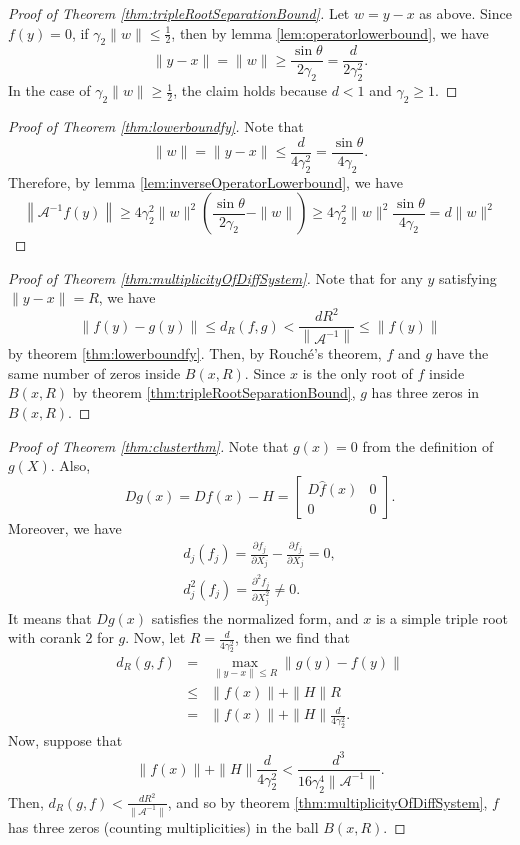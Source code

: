 \documentclass[12pt,oneside,reqno]{amsart}
\theoremstyle{definition}
\begin{document}
\begin{proof}[Proof of Theorem \ref{thm:tripleRootSeparationBound}]
	Let $w=y-x$ as above. Since $f(y)=0$, if $\gamma_2\|w\|\leq \frac{1}{2}$, then by lemma \ref{lem:operatorlowerbound}, we have
	\[\|y-x\|=\|w\|\geq\frac{\sin\theta}{2\gamma_2}=\frac{d}{2\gamma_2^2} .\]
	In the case of $\gamma_2\|w\|\geq \frac{1}{2}$, the claim holds because $d<1$ and $\gamma_2\geq 1$.
\end{proof}
\begin{proof}[Proof of Theorem \ref{thm:lowerboundfy}]
	Note that 
	\[\|w\|=\|y-x\|\leq \frac{d}{4\gamma_2^2}=\frac{\sin\theta}{4\gamma_2}.\]
	Therefore, by lemma \ref{lem:inverseOperatorLowerbound}, we have
	\[\left\|\mathcal{A}^{-1}f(y)\right\|\geq 4\gamma_2^2\|w\|^2\left(\frac{\sin\theta}{2\gamma_2}-\|w\|\right)\geq4\gamma_2^2\|w\|^2\frac{\sin\theta}{4\gamma_2}=d\|w\|^2\]
\end{proof}
\begin{proof}[Proof of Theorem \ref{thm:multiplicityOfDiffSystem}]
	Note that for any $y$ satisfying $\|y-x\|=R$, we have
	\[\|f(y)-g(y)\|\leq d_R(f,g)<\frac{dR^2}{\left\|\mathcal{A}^{-1}\right\|}\leq \|f(y)\|\]
	by theorem \ref{thm:lowerboundfy}. Then, by Rouch\'e's theorem, $f$ and $g$ have the same number of zeros inside $B(x,R)$. Since $x$ is the only root of $f$ inside $B(x,R)$ by theorem \ref{thm:tripleRootSeparationBound}, $g$ has three zeros in $B(x,R)$.
\end{proof}
\begin{proof}[Proof of Theorem \ref{thm:clusterthm}]
	Note that $g(x)=0$ from the definition of $g(X)$. Also, 
	\[Dg(x)=Df(x)-H=\begin{bmatrix}
	D\hat{f}(x) & 0 \\
	0 & 0
	\end{bmatrix}.\]
	Moreover, we have 
	\begin{eqnarray*}
	d_j(f_j) = \frac{\partial f_{j}}{\partial X_j} - \frac{\partial f_{j}}{\partial X_j} = 0,\\
	d_j^2(f_j) = \frac{\partial^2 f_{j}}{\partial X_j^2}\ne 0.
	\end{eqnarray*}
	It means that $Dg(x)$ satisfies the normalized form, and $x$ is a simple triple root with corank $2$ for $g$. Now, let $R=\frac{d}{4\gamma_2^2}$, then we find that 
	\begin{eqnarray*}
	d_R(g,f)&=&\max\limits_{\|y-x\|\leq R}\|g(y)-f(y)\|\\
	& \leq & \|f(x)\|+\|H\|R\\
	& = & \|f(x)\|+\|H\|\frac{d}{4\gamma_2^2}.
	\end{eqnarray*}
	Now, suppose that 
	\[\|f(x)\|+\|H\|\frac{d}{4\gamma_2^2}<\frac{d^3}{16\gamma_2^4\|\mathcal{A}^{-1}\|}.\]
	Then, $d_R(g,f)< \frac{dR^2}{\|\mathcal{A}^{-1}\|}$, and so by theorem \ref{thm:multiplicityOfDiffSystem}, $f$ has three zeros (counting multiplicities) in the ball $B(x,R)$.
\end{proof}


	
\end{document}
